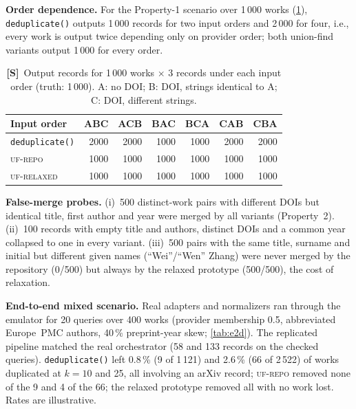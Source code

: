\documentclass[conference]{IEEEtran}
\newcommand{\code}[1]{\texttt{\small #1}}
\begin{document}
\textbf{Order dependence.} For the Property-1 scenario over 1\,000 works (\cref{tab:order}), \code{deduplicate()} outputs 1\,000 records for two input orders and 2\,000 for four, i.e., every work is output twice depending only on provider order; both union-find variants output 1\,000 for every order.

\begin{table}[t]
\centering
\caption{\textbf{[S]}~Output records for 1\,000 works $\times$ 3 records under each input order (truth: 1\,000). A: no DOI; B: DOI, strings identical to A; C: DOI, different strings.}
\label{tab:order}
\footnotesize
\begin{tabular}{@{}l r r r r r r@{}}
\toprule
Input order & ABC & ACB & BAC & BCA & CAB & CBA \\
\midrule
\code{deduplicate()} & 2000 & 2000 & 1000 & 1000 & 2000 & 2000 \\
\textsc{uf-repo} & 1000 & 1000 & 1000 & 1000 & 1000 & 1000 \\
\textsc{uf-relaxed} & 1000 & 1000 & 1000 & 1000 & 1000 & 1000 \\
\bottomrule
\end{tabular}
\end{table}

\textbf{False-merge probes.} (i)~500 distinct-work pairs with different DOIs but identical title, first author and year were merged by all variants (Property~2). (ii)~100 records with empty title and authors, distinct DOIs and a common year collapsed to one in every variant. (iii)~500 pairs with the same title, surname and initial but different given names (``Wei''/``Wen'' Zhang) were never merged by the repository (0/500) but always by the relaxed prototype (500/500), the cost of relaxation.

\textbf{End-to-end mixed scenario.} Real adapters and normalizers ran through the emulator for 20 queries over 400 works (provider membership 0.5, abbreviated Europe~PMC authors, 40\,\% preprint-year skew; \cref{tab:e2d}). The replicated pipeline matched the real orchestrator (58 and 133 records on the checked queries). \code{deduplicate()} left 0.8\,\% (9 of 1\,121) and 2.6\,\% (66 of 2\,522) of works duplicated at $k{=}10$ and 25, all involving an arXiv record; \textsc{uf-repo} removed none of the 9 and 4 of the 66; the relaxed prototype removed all with no work lost. Rates are illustrative.
\end{document}
